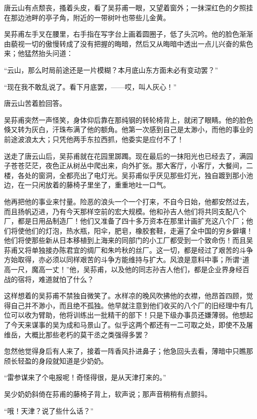 \par 唐云山有点颓丧，搔着头皮，看了吴荪甫一眼，又望着窗外；一抹深红色的夕照挂在那边池畔的亭子角，附近的一带树叶也带些儿金黄。
\par 吴荪甫左手叉在腰里，右手指在写字台上画着圆圈子，低了头沉吟。他的脸色渐渐由藐视一切的傲慢转成了没有把握的晦暗，然后又从晦暗中透出一点儿兴奋的紫色来；他猛然抬头问道：
\par “云山，那么时局前途还是一片模糊？本月底山东方面未必有变动罢？”
\par “现在我不敢乱说了。看下月底罢，——哎，叫人灰心！”
\par 唐云山苦着脸回答。
\par 吴荪甫突然一声怪笑，身体仰后靠在那纯钢的转轮椅背上，就闭了眼睛。他的脸色倏又转为灰白，汗珠布满了他的额角。他第一次感到自己是太渺小，而他的事业的前途波浪太大；只凭他两手东拉西抓，他委实是应付不了！
\par 送走了唐云山后，吴荪甫就在花园里踯躅。现在最后的一抹阳光也已经去了，满园子苍苍茫茫，夜色正从树丛中爬出来，向外扩张。那大客厅，小客厅，大餐间，二楼，各处的窗洞，全都亮出了电灯光。吴荪甫似乎厌见那些灯光，独自踱到那小池边，在一只闲放着的藤椅子里坐了，重重地吐一口气。
\par 他再把他的事业来忖量。险恶的浪头一个一个打来，不自今日始，他都安然过去，而且扬帆迈进，乃有今天那样空前的宏大规模。他和孙吉人他们将共同支配八个厂，都是日用品制造厂！他们又准备了四十多万资本在那里计画扩充这八个厂；他们将使他们的灯泡，热水瓶，阳伞，肥皂，橡胶套鞋，走遍了全中国的穷乡僻壤！他们将使那些新从日本移植到上海来的同部门的小工厂都受到一个致命伤！而且吴荪甫又将单独接办陈君宜的绸厂和朱吟秋的丝厂。这一切，都是经过了艰苦的斗争方始取得，亦必须以同样艰苦的斗争方能维持与扩大。风浪是意料中事；所谓“道高一尺，魔高一丈！”他，吴荪甫，以及他的同志孙吉人他们，都是企业界身经百战的宿将，难道就怕了什么？
\par 这样想着的吴荪甫不禁独自微笑了。水样凉的晚风吹拂他的衣襟，他昂首四顾，觉得自己并不渺小，而且绝不孤独。他早就注意到他们收买的八个厂的旧经理中有几位可以收为臂助，他将训练出一批精干的部下！只是下级办事员还嫌薄弱。他想起了今天来谋事的吴为成和马景山了。似乎这两个都还有一二可取之处，即使不及屠维岳，大概比那些老朽的莫干丞之类强得多罢？
\par 忽然他觉得身后有人来了，接着一阵香风扑进鼻子；他急回头去看，薄暗中只瞧那颀长轻盈的身段就知道是少奶奶。
\par “雷参谋来了个电报呢！奇怪得很，是从天津打来的。”
\par 吴少奶奶斜倚在荪甫的藤椅子背上，软声说；那声音稍稍有点颤抖。
\par “哦！天津？说了些什么话？”
